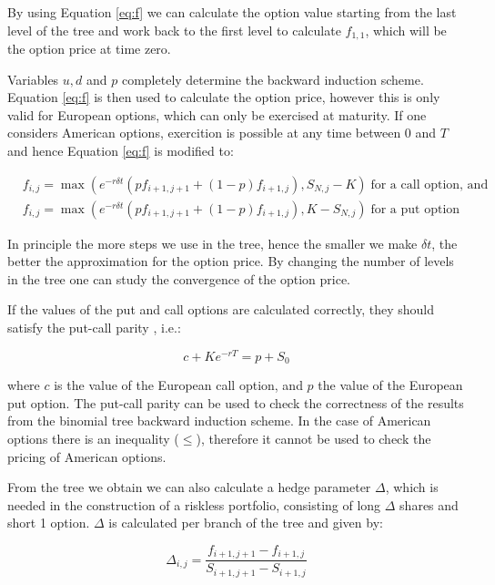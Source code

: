 \documentclass[11pt,a4paper]{article}
\begin{document}
By using Equation \ref{eq:f} we can calculate the option value starting from the last level of the tree and work back to the first level to calculate $f_{1,1}$, which will be the option price at time zero.

Variables $u,d$ and $p$ completely determine the backward induction scheme. Equation \ref{eq:f} is then used to calculate the option price, however this is only valid for European options, which can only be exercised at maturity. If one considers American options, exercition is possible at any time between 0 and $T$ and hence Equation \ref{eq:f} is modified to:

\begin{align}
&f_{i,j} = \max(e^{-r \delta t}(p f_{i+1,j+1} + (1 - p) f_{i+1,j}),S_{N,j} - K) \; \text{for a call option, and} \nonumber \\
&f_{i,j} = \max(e^{-r \delta t}(p f_{i+1,j+1} + (1 - p) f_{i+1,j}),K - S_{N,j}) \; \text{for a put option} 
\end{align}

In principle the more steps we use in the tree, hence the smaller we make $\delta t$, the better the approximation for the option price. By changing the number of levels in the tree one can study the convergence of the option price.

If the values of the put and call options are calculated correctly, they should satisfy the put-call parity \cite{hull}, i.e.:

\begin{equation}
  c + K e^{-rT} = p + S_{0}
\end{equation}

where $c$ is the value of the European call option, and $p$ the value of the European put option. The put-call parity can be used to check the correctness of the results from the binomial tree backward induction scheme. In the case of American options there is an inequality ($\leq$), therefore it cannot be used to check the pricing of American options.

From the tree we obtain we can also calculate a hedge parameter $\Delta$, which is needed in the construction of a riskless portfolio, consisting of long $\Delta$ shares and short 1 option. $\Delta$ is calculated per branch of the tree and given by:

\begin{equation}
  \label{eq:deltadisc}
  \Delta_{i,j} = \frac{f_{i+1,j+1} - f_{i+1,j}}{S_{i+1,j+1} - S_{i+1,j}}
\end{equation}
\end{document}
